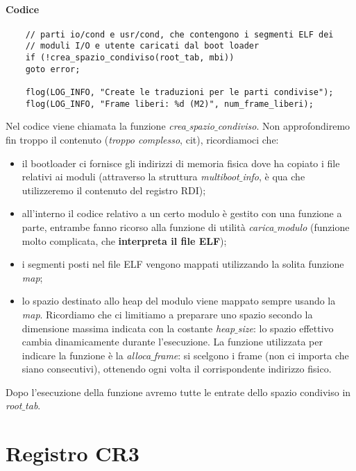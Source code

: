 \paragraph{Codice}
\small 
\begin{verbatim}
	// parti io/cond e usr/cond, che contengono i segmenti ELF dei
	// moduli I/O e utente caricati dal boot loader
	if (!crea_spazio_condiviso(root_tab, mbi))
	goto error;
	
	flog(LOG_INFO, "Create le traduzioni per le parti condivise");
	flog(LOG_INFO, "Frame liberi: %d (M2)", num_frame_liberi);
\end{verbatim}
\normalsize 
Nel codice viene chiamata la funzione \emph{crea$\_$spazio$\_$condiviso}. Non approfondiremo fin troppo il contenuto (\textit{troppo complesso}, cit), ricordiamoci che:
\begin{itemize}
	\item il bootloader ci fornisce gli indirizzi di memoria fisica dove ha copiato i file relativi ai moduli (attraverso la struttura \emph{multiboot$\_$info}, è qua che utilizzeremo il contenuto del registro RDI);
	\item all'interno il codice relativo a un certo modulo è gestito con una funzione a parte, entrambe fanno ricorso alla funzione di utilità \emph{carica$\_$modulo} (funzione molto complicata, che \textbf{interpreta il file ELF});
	\item i segmenti posti nel file ELF vengono mappati utilizzando la solita funzione \emph{map};
	\item lo spazio destinato allo heap del modulo viene mappato sempre usando la \emph{map}. Ricordiamo che ci limitiamo a preparare uno spazio secondo la dimensione massima indicata con la costante \emph{heap$\_$size}: lo spazio effettivo cambia dinamicamente durante l'esecuzione. La funzione utilizzata per indicare la funzione è la \emph{alloca$\_$frame}: si scelgono i frame (non ci importa che siano consecutivi), ottenendo ogni volta il corrispondente indirizzo fisico. 
\end{itemize}
Dopo l'esecuzione della funzione avremo tutte le entrate dello spazio condiviso in \emph{root$\_$tab}. 

\section{Registro CR3}

